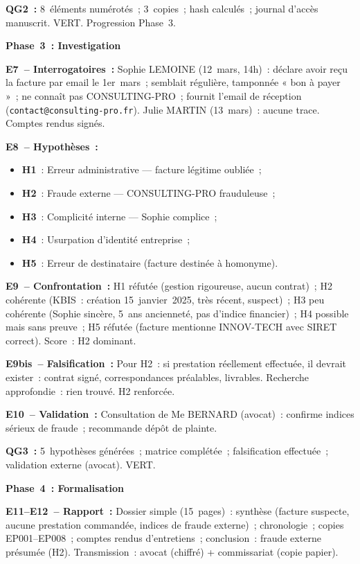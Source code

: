 \textbf{QG2~:} 8~éléments numérotés~; 3~copies~; hash calculés~; journal
d'accès manuscrit. VERT. Progression Phase~3.

\textbf{Phase~3~: Investigation}

\textbf{E7~-- Interrogatoires~:} Sophie LEMOINE (12~mars, 14h)~: déclare avoir
reçu la facture par email le 1er~mars~; semblait régulière, tamponnée
« bon à payer »~; ne connaît pas CONSULTING-PRO~; fournit l'email de réception
(\texttt{contact@consulting-pro.fr}). Julie MARTIN (13~mars)~: aucune trace.
Comptes rendus signés.

\textbf{E8~-- Hypothèses~:}
\begin{itemize}
    \item \textbf{H1}~: Erreur administrative --- facture légitime oubliée~;
    \item \textbf{H2}~: Fraude externe --- CONSULTING-PRO frauduleuse~;
    \item \textbf{H3}~: Complicité interne --- Sophie complice~;
    \item \textbf{H4}~: Usurpation d'identité entreprise~;
    \item \textbf{H5}~: Erreur de destinataire (facture destinée à homonyme).
\end{itemize}

\textbf{E9~-- Confrontation~:} H1 réfutée (gestion rigoureuse, aucun contrat)~;
H2 cohérente (KBIS~: création 15~janvier~2025, très récent, suspect)~;
H3 peu cohérente (Sophie sincère, 5~ans ancienneté, pas d'indice financier)~;
H4 possible mais sans preuve~; H5 réfutée (facture mentionne INNOV-TECH
avec SIRET correct). Score~: H2 dominant.

\textbf{E9bis~-- Falsification~:} Pour H2~: si prestation réellement effectuée,
il devrait exister~: contrat signé, correspondances préalables, livrables.
Recherche approfondie~: rien trouvé. H2 renforcée.

\textbf{E10~-- Validation~:} Consultation de Me BERNARD (avocat)~: confirme
indices sérieux de fraude~; recommande dépôt de plainte.

\textbf{QG3~:} 5~hypothèses générées~; matrice complétée~; falsification
effectuée~; validation externe (avocat). VERT.

\textbf{Phase~4~: Formalisation}

\textbf{E11--E12~-- Rapport~:} Dossier simple (15~pages)~: synthèse
(facture suspecte, aucune prestation commandée, indices de fraude externe)~;
chronologie~; copies EP001--EP008~; comptes rendus d'entretiens~;
conclusion~: fraude externe présumée (H2). Transmission~: avocat (chiffré)
+ commissariat (copie papier).

